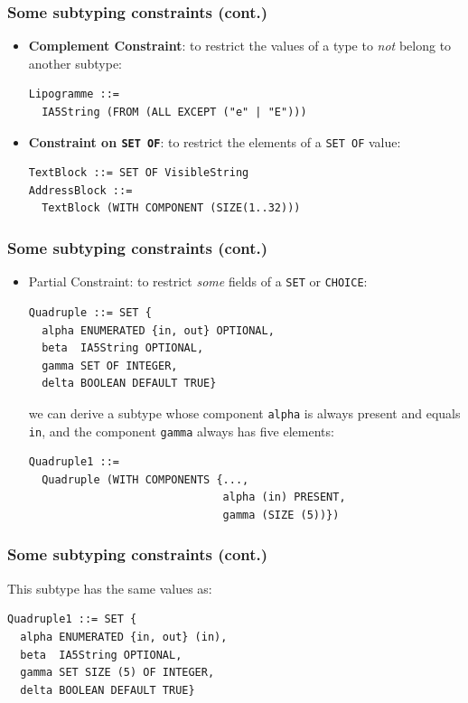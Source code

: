 \documentclass[compress,dvips,xcolor={dvipsnames},t]{beamer}
\begin{document}
\begin{frame}[containsverbatim]
\frametitle{Some subtyping constraints (cont.)}

\begin{itemize}

  \item \textbf{Complement Constraint}: to restrict the values of a
        type to \emph{not} belong to another subtype:

\begin{verbatim}
Lipogramme ::=
  IA5String (FROM (ALL EXCEPT ("e" | "E")))
\end{verbatim}

\bigskip\bigskip

  \item \textbf{Constraint on \texttt{SET OF}}: to restrict the
        elements of a \texttt{SET OF} value:

\begin{verbatim}
TextBlock ::= SET OF VisibleString
AddressBlock ::=
  TextBlock (WITH COMPONENT (SIZE(1..32)))
\end{verbatim}

\end{itemize}

\end{frame}

\begin{frame}[containsverbatim]
\frametitle{Some subtyping constraints (cont.)}

\begin{itemize}
  \item \textsf{Partial Constraint}: to restrict \emph{some} fields
        of a \texttt{SET} or \texttt{CHOICE}:

\begin{verbatim}
Quadruple ::= SET {
  alpha ENUMERATED {in, out} OPTIONAL,
  beta  IA5String OPTIONAL,
  gamma SET OF INTEGER,
  delta BOOLEAN DEFAULT TRUE}
\end{verbatim}

we can derive a subtype whose component \verb+alpha+ is always present
and equals \verb+in+, and the component \verb+gamma+ always has
five elements:
\begin{verbatim}
Quadruple1 ::=
  Quadruple (WITH COMPONENTS {...,
                              alpha (in) PRESENT,
                              gamma (SIZE (5))})
\end{verbatim}

\end{itemize}

\end{frame}

\begin{frame}[containsverbatim]
\frametitle{Some subtyping constraints (cont.)}

This subtype has the same values as:
\begin{verbatim}
Quadruple1 ::= SET {
  alpha ENUMERATED {in, out} (in),
  beta  IA5String OPTIONAL,
  gamma SET SIZE (5) OF INTEGER,
  delta BOOLEAN DEFAULT TRUE}
\end{verbatim}

\end{frame}
\end{document}
